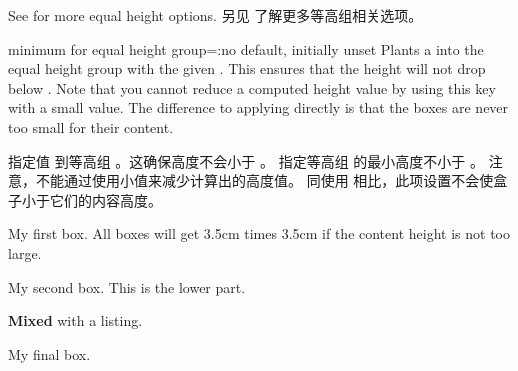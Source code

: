 \medskip
\begin{marker}
See  for more equal height options.
另见  了解更多等高组相关选项。
\end{marker}



\begin{docTcbKey}{minimum for equal height group}{=:}{no default, initially unset}
Plants a  into the equal height group with
the given . This ensures that the height will not drop below
. 
Note that you cannot reduce a computed height value by using this key with a small value.
The difference to applying  directly is that the boxes
are never too small for their content.

指定值  到等高组 。这确保高度不会小于 。
指定等高组  的最小高度不小于 。%
注意，不能通过使用小值来减少计算出的高度值。%
同使用  相比，此项设置不会使盒子小于它们的内容高度。

\begin{dispExample}

\begin{tcolorbox}
My first box. All boxes will get 3.5cm times 3.5cm
if the content height is not too large.
\end{tcolorbox}%
\begin{tcolorbox}
My second box.
\tcblower
This is the lower part.
\end{tcolorbox}%
\begin{tcblisting}{}
\textbf{Mixed}
with a listing.
\end{tcblisting}
\begin{tcolorbox}[title={Fourth box}]
My final box.
\end{tcolorbox}%
\end{dispExample}
\end{docTcbKey}

